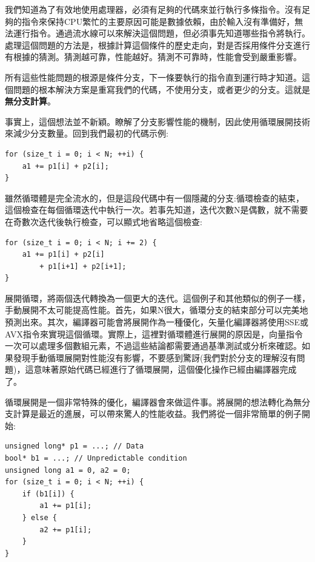 
我們知道為了有效地使用處理器，必須有足夠的代碼來並行執行多條指令。沒有足夠的指令來保持CPU繁忙的主要原因可能是數據依賴，由於輸入沒有準備好，無法運行指令。通過流水線可以來解決這個問題，但必須事先知道哪些指令將執行。處理這個問題的方法是，根據計算這個條件的歷史走向，對是否採用條件分支進行有根據的猜測。猜測越可靠，性能越好。猜測不可靠時，性能會受到嚴重影響。

所有這些性能問題的根源是條件分支，下一條要執行的指令直到運行時才知道。這個問題的根本解決方案是重寫我們的代碼，不使用分支，或者更少的分支。這就是\textbf{無分支計算}。


事實上，這個想法並不新穎。瞭解了分支影響性能的機制，因此使用循環展開技術來減少分支數量。回到我們最初的代碼示例:

\begin{lstlisting}[style=styleCXX]
for (size_t i = 0; i < N; ++i) {
	a1 += p1[i] + p2[i];
}
\end{lstlisting}

雖然循環體是完全流水的，但是這段代碼中有一個隱藏的分支:循環檢查的結束，這個檢查在每個循環迭代中執行一次。若事先知道，迭代次數N是偶數，就不需要在奇數次迭代後執行檢查，可以顯式地省略這個檢查:

\begin{lstlisting}[style=styleCXX]
for (size_t i = 0; i < N; i += 2) {
	a1 += p1[i] + p2[i]
		+ p1[i+1] + p2[i+1];
}
\end{lstlisting}

展開循環，將兩個迭代轉換為一個更大的迭代。這個例子和其他類似的例子一樣，手動展開不太可能提高性能。首先，如果N很大，循環分支的結束部分可以完美地預測出來。其次，編譯器可能會將展開作為一種優化，矢量化編譯器將使用SSE或AVX指令來實現這個循環。實際上，這裡對循環體進行展開的原因是，向量指令一次可以處理多個數組元素，不過這些結論都需要通過基準測試或分析來確認。如果發現手動循環展開對性能沒有影響，不要感到驚訝(我們對於分支的理解沒有問題)，這意味著原始代碼已經進行了循環展開，這個優化操作已經由編譯器完成了。


循環展開是一個非常特殊的優化，編譯器會來做這件事。將展開的想法轉化為無分支計算是最近的進展，可以帶來驚人的性能收益。我們將從一個非常簡單的例子開始:

\begin{lstlisting}[style=styleCXX]
unsigned long* p1 = ...; // Data
bool* b1 = ...; // Unpredictable condition
unsigned long a1 = 0, a2 = 0;
for (size_t i = 0; i < N; ++i) {
	if (b1[i]) {
		a1 += p1[i];
	} else {
		a2 += p1[i];
	}
}
\end{lstlisting}

